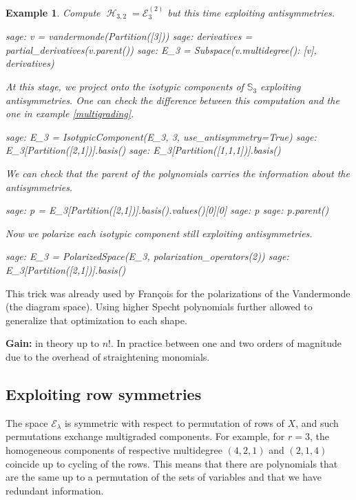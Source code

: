 \documentclass[letter,12pt]{article}
\newcommand{\Sym}[1]{\mathbb{S}_{#1}}
\DeclareMathOperator{\harmonics}{\mathcal{H}}
\newtheorem{example}{Example}
\begin{document}
	\begin{example}
			Compute $\harmonics_{3,2} = \mathcal{E}_3^{(2)}$ but this time exploiting antisymmetries. 
		\begin{sagecommandline}
			sage: v = vandermonde(Partition([3]))
			sage: derivatives = partial_derivatives(v.parent())
			sage: E_3 = Subspace({v.multidegree(): [v]}, derivatives)
		\end{sagecommandline}
		At this stage, we project onto the isotypic components of $\Sym{3}$ exploiting antisymmetries. One can check the difference between this computation and the one in example \ref{multigrading}. 
		\begin{sagecommandline}
			sage: E_3 = IsotypicComponent(E_3, 3, use_antisymmetry=True)
			sage: E_3[Partition([2,1])].basis()
			sage: E_3[Partition([1,1,1])].basis()
		\end{sagecommandline}
		We can check that the parent of the polynomials carries the information about the antisymmetries. 
		\begin{sagecommandline}
			sage: p = E_3[Partition([2,1])].basis().values()[0][0]
			sage: p
			sage: p.parent()
		\end{sagecommandline}
		Now we polarize each isotypic component still exploiting antisymmetries.  
		\begin{sagecommandline}
			sage: E_3 = PolarizedSpace(E_3, polarization_operators(2))
			sage: E_3[Partition([2,1])].basis()
		\end{sagecommandline}
	\end{example}
	
	This trick was already used by François for the polarizations of the Vandermonde (the diagram space). Using higher Specht polynomials further allowed  to generalize that optimization to each shape.
	
	\textbf{Gain:} in theory up to $n!$. In practice between one and two orders of magnitude due to the overhead of straightening monomials.
	
	\subsection{Exploiting row symmetries}
	
	The space $\mathcal{E}_\lambda$ is symmetric with respect to permutation of rows of $X$, and such permutations exchange multigraded components. For example, for $r=3$, the homogeneous components of respective multidegree $(4,2,1)$ and $(2,1,4)$ coincide up to cycling of the rows. This means that there are polynomials that are the same up to a permutation of the sets of variables and that we have redundant information. 
	
\end{document}
